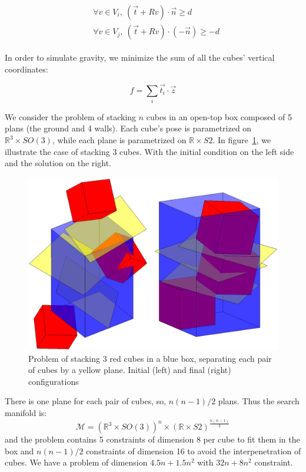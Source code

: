 \begin{align}
  \begin{split}
    &\forall v\in V_i,\ (\vec{t} + R v)\cdot \vec{n} \geq d \\
    &\forall v\in V_j,\ (\vec{t} + R v)\cdot \left(-\vec{n}\right) \geq -d
  \end{split}
\end{align}

In order to simulate gravity, we minimize the sum of all the cubes' vertical coordinates:

\begin{equation}
  f = \sum\limits_i \vec{t_i}\cdot \vec{z}
\end{equation}

We consider the problem of stacking $n$ cubes in an open-top box composed of 5 plans (the ground and 4 walls).
Each cube's pose is parametrized on $\mathbb{R}^3\times SO(3)$, while each plane is parametrized on $\mathbb{R}\times S2$.
In figure~\ref{fig:cubes}, we illustrate the case of stacking 3 cubes.
With the initial condition on the left side and the solution on the right.
\begin{figure}
\centering
  \includegraphics[width=.8\linewidth]{3cubes.png}
  \caption{Problem of stacking 3 red cubes in a blue box, separating each pair of cubes by a yellow plane. Initial (left) and final (right) configurations}
\label{fig:cubes}
\end{figure}

There is one plane for each pair of cubes, so, $n(n-1)/2$ plans.
Thus the search manifold is:
\begin{equation}
  \mathcal{M} = {\left( \mathbb{R}^3\times SO(3) \right)}^n \times {\left( \mathbb{R} \times S2 \right)}^{\frac{n(n-1)}{2}} \nonumber
\end{equation}
and the problem contains 5 constraints of dimension 8 per cube to fit them in the box and $n(n-1)/2$ constraints of dimension 16 to avoid the interpenetration of cubes.
We have a problem of dimension $4.5n+1.5n^2$ with $32n+8n^2$ constraint.

